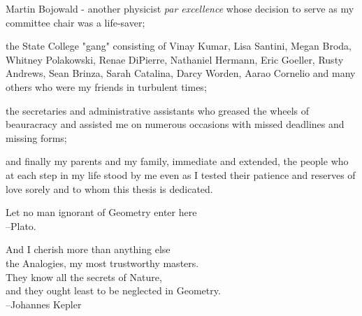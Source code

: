 \documentclass[10pt,rmp,aps]{psuthesis}
\begin{document}
\begin{singlespace}
\begin{frontmatter}
Martin Bojowald - another physicist \emph{par excellence} whose decision to serve as my committee chair was a life-saver;

the State College "gang" consisting of Vinay Kumar, Lisa Santini, Megan Broda, Whitney Polakowski, Renae DiPierre, Nathaniel Hermann, Eric Goeller, Rusty Andrews, Sean Brinza, Sarah Catalina, Darcy Worden, Aarao Cornelio and many others who were my friends in turbulent times;

the secretaries and administrative assistants who greased the wheels of beauracracy and assisted me on numerous occasions with missed deadlines and missing forms;

and finally my parents and my family, immediate and extended, the people who at each step in my life stood by me even as I tested their patience and reserves of love sorely and to whom this thesis is dedicated.


\clearpage

\vspace*{2.0truein}

\parbox{4.0truein}{
\par\noindent
Let no man ignorant of Geometry enter here\\
\hspace*{\fill}--Plato.
}
\normalsize

\vspace*{2.0truein}

\parbox{4.0truein}{
\par\noindent
And I cherish more than anything else \\
\hspace*{0.5 in}the Analogies, my most trustworthy masters. \\
They know all the secrets of Nature, \\
\hspace*{0.5 in}and they ought least to be neglected in Geometry.\\
\hspace*{\fill}--Johannes Kepler
}


\end{frontmatter}




\end{singlespace}
\end{document}
